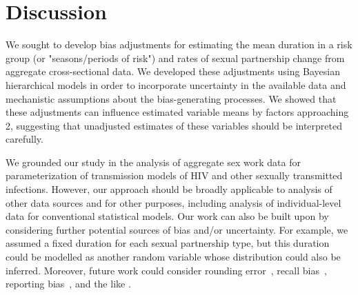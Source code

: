 \section{Discussion}
We sought to develop bias adjustments for estimating
the mean duration in a risk group (or "seasons/periods of risk") and rates of sexual partnership change
from aggregate cross-sectional data.
We developed these adjustments using Bayesian hierarchical models in order to incorporate
uncertainty in the available data and mechanistic assumptions about the bias-generating processes.
We showed that these adjustments can influence estimated variable means by factors approaching 2,
suggesting that unadjusted estimates of these variables should be interpreted carefully.
\par
We grounded our study in the analysis of
aggregate sex work data for parameterization of transmission models of HIV and other sexually transmitted infections. %
However, our approach should be broadly applicable to
analysis of other data sources and for other purposes, %
including analysis of individual-level data for conventional statistical models. %
Our work can also be built upon by considering
further potential sources of bias and/or uncertainty.
For example, we assumed a fixed duration for each sexual partnership type,
but this duration could be modelled as another random variable
whose distribution could also be inferred.
Moreover, future work could consider
rounding error~\cite{Mills2014},
recall bias~\cite{Ramjee1999},
reporting bias~\cite{Lowndes2012},
and the like \cite{Fenton2001}.

